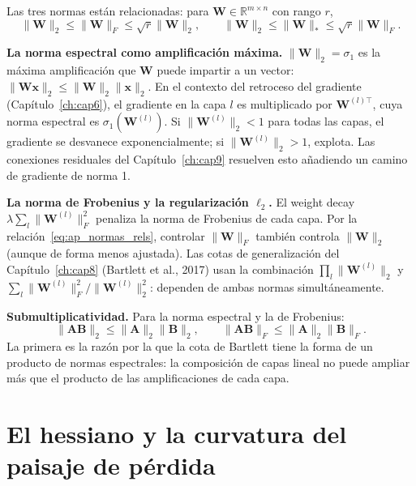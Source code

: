Las tres normas están relacionadas: para $\bm{W}\in\mathbb{R}^{m\times n}$
con rango $r$,
\begin{equation}
  \|\bm{W}\|_2 \leq \|\bm{W}\|_F \leq \sqrt{r}\|\bm{W}\|_2,
  \qquad
  \|\bm{W}\|_2 \leq \|\bm{W}\|_* \leq \sqrt{r}\|\bm{W}\|_F.
  \label{eq:ap_normas_rels}
\end{equation}

\medskip\noindent\textbf{La norma espectral como amplificación máxima.}
$\|\bm{W}\|_2 = \sigma_1$ es la máxima amplificación que $\bm{W}$ puede
impartir a un vector: $\|\bm{W}\bm{x}\|_2\leq\|\bm{W}\|_2\|\bm{x}\|_2$.
En el contexto del retroceso del gradiente (Capítulo~\ref{ch:cap6}), el
gradiente en la capa $l$ es multiplicado por $\bm{W}^{(l)\top}$, cuya norma
espectral es $\sigma_1(\bm{W}^{(l)})$. Si $\|\bm{W}^{(l)}\|_2 < 1$ para
todas las capas, el gradiente se desvanece exponencialmente; si $\|\bm{W}^{(l)}\|_2 > 1$,
explota. Las conexiones residuales del Capítulo~\ref{ch:cap9} resuelven
esto añadiendo un camino de gradiente de norma 1.

\medskip\noindent\textbf{La norma de Frobenius y la regularización $\ell_2$.}
El weight decay $\lambda\sum_l\|\bm{W}^{(l)}\|_F^2$ penaliza la norma de
Frobenius de cada capa. Por la relación~\eqref{eq:ap_normas_rels}, controlar
$\|\bm{W}\|_F$ también controla $\|\bm{W}\|_2$ (aunque de forma menos ajustada).
Las cotas de generalización del Capítulo~\ref{ch:cap8} (Bartlett et al., 2017)
usan la combinación $\prod_l\|\bm{W}^{(l)}\|_2$ y $\sum_l\|\bm{W}^{(l)}\|_F^2/
\|\bm{W}^{(l)}\|_2^2$: dependen de ambas normas simultáneamente.

\medskip\noindent\textbf{Submultiplicatividad.} Para la norma espectral y la
de Frobenius:
\begin{equation}
  \|\bm{A}\bm{B}\|_2 \leq \|\bm{A}\|_2\|\bm{B}\|_2,
  \qquad
  \|\bm{A}\bm{B}\|_F \leq \|\bm{A}\|_2\|\bm{B}\|_F.
  \label{eq:ap_submulti}
\end{equation}
La primera es la razón por la que la cota de Bartlett tiene la forma de un
producto de normas espectrales: la composición de capas lineal no puede ampliar
más que el producto de las amplificaciones de cada capa.

\section{El hessiano y la curvatura del paisaje de pérdida}
\label{sec:ap_hessiano}

